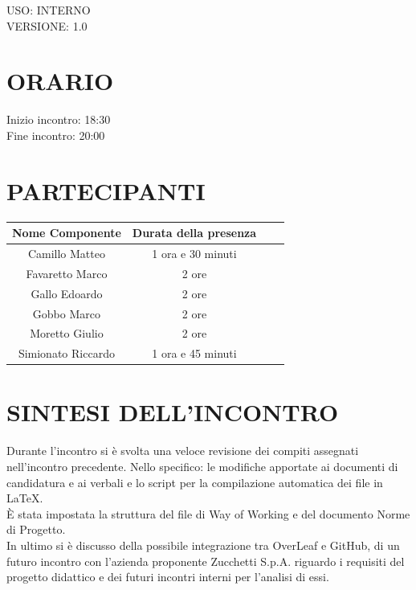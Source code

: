 \documentclass[5pt]{article}
\begin{document}
\begin{flushright}
    \begin{spacing}{1}
        USO: INTERNO\\
        VERSIONE: 1.0\\ %
    \end{spacing}
\end{flushright}


\restoregeometry

\pagebreak






\section{\Large ORARIO}
\begin{spacing}{1.5}
    {\large Inizio incontro: 18:30}\\
    {\large Fine incontro: 20:00}
\end{spacing}

\section{PARTECIPANTI}
\setlength\cellspacetoplimit{6pt}
\setlength\cellspacebottomlimit{6pt}

\begin{table}[ht]
  \begin{tabular}{|Sc|Sc|}
    \hline
    \textbf{Nome Componente} & \textbf{Durata della presenza} \\
    \hline
    Camillo Matteo & 1 ora e 30 minuti \\
    Favaretto Marco & 2 ore \\
    Gallo Edoardo & 2 ore \\
    Gobbo Marco & 2 ore \\
    Moretto Giulio & 2 ore \\
    Simionato Riccardo & 1 ora e 45 minuti \\
    \hline
  \end{tabular}
  \label{tab:conference}
\end{table}

\section{SINTESI DELL'INCONTRO}
Durante l'incontro si è svolta una veloce revisione dei compiti assegnati nell'incontro precedente. Nello specifico: le modifiche apportate ai documenti di candidatura e ai verbali e lo script per la compilazione automatica dei file in \LaTeX .\\
È stata impostata la struttura del file di Way of Working e del documento Norme di Progetto.\\
In ultimo si è discusso della possibile integrazione tra OverLeaf e GitHub, di un futuro incontro con l'azienda proponente Zucchetti S.p.A. riguardo i requisiti del progetto didattico e dei futuri incontri interni per l'analisi di essi.
\end{document}
